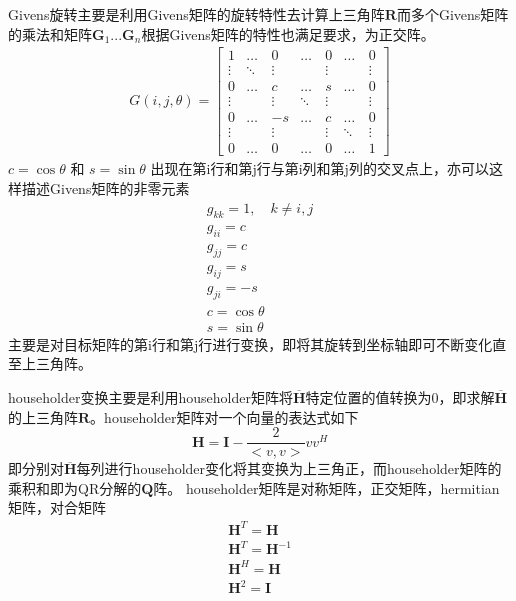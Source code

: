 \documentclass[bachelor,nocolorlinks, printoneside]{seuthesis} %
\begin{document}
\begin{Main}
Givens旋转主要是利用Givens矩阵的旋转特性去计算上三角阵$\mathbf{R}$而多个Givens矩阵的乘法和矩阵$\mathbf{G}_1...\mathbf{G}_n$根据Givens矩阵的特性也满足要求，为正交阵。
\begin{eqnarray}\label{key}
G(i,j,\theta) = \left[
\begin{array}{ccccccc}
1 & \ldots & 0 & \ldots & 0 & \ldots & 0 \\
\vdots & \ddots & \vdots & \quad & \vdots & \quad & \vdots \\
0 & \ldots & c & \ldots & s & \ldots & 0 \\
\vdots & \quad & \vdots & \ddots & \vdots & \quad & \vdots \\
0 & \ldots & -s & \ldots & c & \ldots & 0 \\
\vdots & \quad & \vdots & \quad & \vdots & \ddots & \vdots \\
0 & \ldots & 0 & \ldots & 0 & \ldots & 1 
\end{array}
\right]
\end{eqnarray}
$c=\cos\theta$ 和 $s = \sin\theta$ 出现在第i行和第j行与第i列和第j列的交叉点上，亦可以这样描述Givens矩阵的非零元素
\begin{eqnarray}\label{key}
g_{kk} = 1 , \quad k \neq i,j  \nonumber\\ 
g_{ii} = c  \nonumber \\
g_{jj} = c  \nonumber \\
g_{ij} = s  \nonumber \\
g_{ji} = -s  \nonumber \\  
c=\cos\theta  \nonumber \\
s = \sin\theta  \nonumber
\end{eqnarray}
主要是对目标矩阵的第i行和第j行进行变换，即将其旋转到坐标轴即可不断变化直至上三角阵。

householder变换主要是利用householder矩阵将$\overline{\mathbf{H}}$特定位置的值转换为0，即求解$\overline{\mathbf{H}}$的上三角阵$\mathbf{R}$。householder矩阵对一个向量的表达式如下
\begin{equation}\label{key}
\mathbf{H} = \mathbf{I} - \frac{2}{<v,v>} v v^H
\end{equation}
即分别对$\overline{\mathbf{H}}$每列进行householder变化将其变换为上三角正，而householder矩阵的乘积和即为QR分解的$\mathbf{Q}$阵。
householder矩阵是对称矩阵，正交矩阵，hermitian矩阵，对合矩阵
\begin{eqnarray}\label{key}
\mathbf{H}^T = \mathbf{H}  \nonumber \\
\mathbf{H}^T = \mathbf{H}^{-1}  \nonumber\\
\mathbf{H}^H = \mathbf{H}  \nonumber\\
\mathbf{H}^2 = \mathbf{I} \nonumber
\end{eqnarray}


\end{Main}
\end{document}
